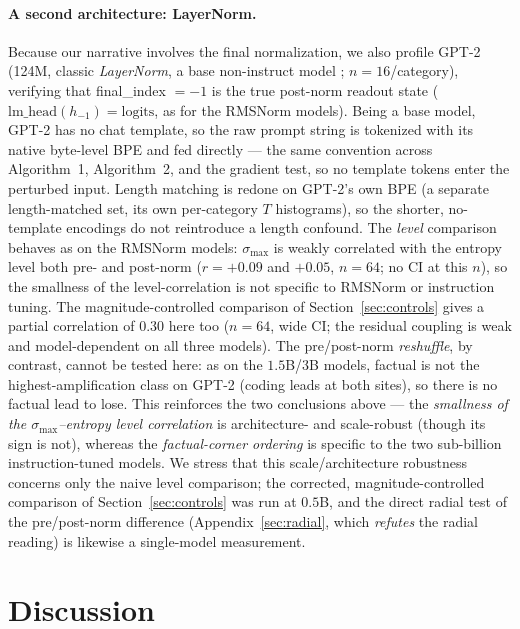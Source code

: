 \documentclass{article}
\begin{document}
\paragraph{A second architecture: LayerNorm.}
Because our narrative involves the final normalization, we also profile GPT-2 (124M, classic
\emph{LayerNorm}, a base non-instruct model \cite{radford2019language}; $n=16$/category), verifying that final\_index $=-1$ is the
true post-norm readout state ($\mathrm{lm\_head}(h_{-1})=\text{logits}$, as for the RMSNorm models).
Being a base model, GPT-2 has no chat template, so the raw prompt string is tokenized with its native
byte-level BPE and fed directly --- the same convention across Algorithm~1, Algorithm~2, and the
gradient test, so no template tokens enter the perturbed input. Length matching is redone on GPT-2's
own BPE (a separate length-matched set, its own per-category $T$ histograms), so the shorter,
no-template encodings do not reintroduce a length confound.
The \emph{level} comparison behaves as on the RMSNorm models: $\sigma_{\max}$ is weakly correlated
with the entropy level both pre- and post-norm ($r=+0.09$ and $+0.05$, $n=64$; no CI at this $n$), so
the smallness of the level-correlation is not specific to RMSNorm or instruction tuning. The
magnitude-controlled comparison of Section~\ref{sec:controls} gives a partial correlation of $0.30$
here too ($n=64$, wide CI; the residual coupling is weak and model-dependent on all three models). The
pre/post-norm
\emph{reshuffle}, by contrast, cannot be tested here: as on the $1.5$B/$3$B models, factual is not the
highest-amplification class on GPT-2 (coding leads at both sites), so there is no factual lead to
lose. This reinforces the two conclusions above --- the \emph{smallness of the $\sigma_{\max}$--entropy
level correlation} is architecture- and scale-robust (though its sign is not), whereas the
\emph{factual-corner ordering} is specific to the two sub-billion instruction-tuned models. We stress
that this scale/architecture robustness concerns only the naive level comparison; the corrected,
magnitude-controlled comparison of Section~\ref{sec:controls} was run at $0.5$B, and the direct radial
test of the pre/post-norm difference (Appendix~\ref{sec:radial}, which \emph{refutes} the radial
reading) is likewise a single-model measurement.

\section{Discussion}
\label{sec:discussion}
\end{document}

